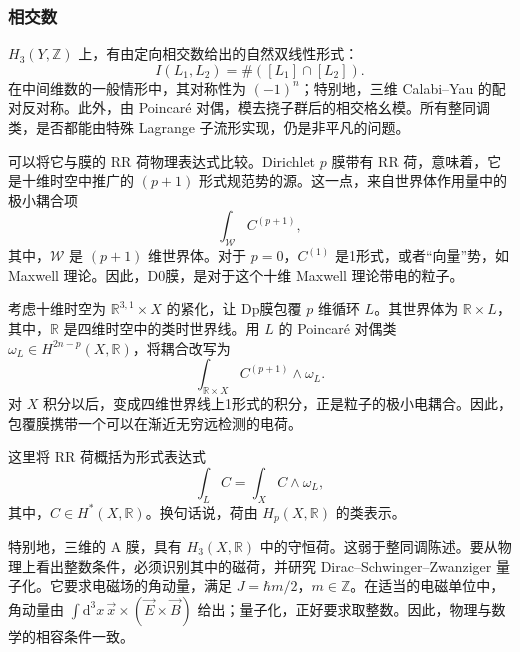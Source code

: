 \subsubsection{相交数}\label{sec:5.1.2.1}

$H_3(Y,\mathbb{Z})$ 上，有由定向相交数给出的自然双线性形式：
\begin{equation}\label{eq:5.2}
I(L_1,L_2)=\#([L_1]\cap[L_2]).
\end{equation}
在中间维数的一般情形中，其对称性为 $(-1)^n$；特别地，三维 Calabi--Yau 的配对反对称。此外，由 Poincar\'e 对偶，模去挠子群后的相交格幺模。所有整同调类，是否都能由特殊 Lagrange 子流形实现，仍是非平凡的问题。

可以将它与膜的 RR 荷物理表达式比较。Dirichlet $p$ 膜带有 RR 荷，意味着，它是十维时空中推广的 $(p+1)$ 形式规范势的源。这一点，来自世界体作用量中的极小耦合项
\begin{equation}\label{eq:5.3}
\int_{\mathcal W}C^{(p+1)},
\end{equation}
其中，$\mathcal W$ 是 $(p+1)$ 维世界体。对于 $p=0$，$C^{(1)}$ 是1形式，或者“向量”势，如 Maxwell 理论。因此，D0膜，是对于这个十维 Maxwell 理论带电的粒子。

考虑十维时空为 $\mathbb{R}^{3,1}\times X$ 的紧化，让 Dp膜包覆 $p$ 维循环 $L$。其世界体为 $\mathbb{R}\times L$，其中，$\mathbb{R}$ 是四维时空中的类时世界线。用 $L$ 的 Poincar\'e 对偶类 $\omega_L\in H^{2n-p}(X,\mathbb{R})$，将耦合改写为
\begin{equation}\label{eq:5.4}
\int_{\mathbb{R}\times X}C^{(p+1)}\wedge\omega_L.
\end{equation}
对 $X$ 积分以后，变成四维世界线上1形式的积分，正是粒子的极小电耦合。因此，包覆膜携带一个可以在渐近无穷远检测的电荷。

这里将 RR 荷概括为形式表达式
\begin{equation}\label{eq:5.5}
\int_LC=\int_XC\wedge\omega_L,
\end{equation}
其中，$C\in H^*(X,\mathbb{R})$。换句话说，荷由 $H_p(X,\mathbb{R})$ 的类表示。

特别地，三维的 A 膜，具有 $H_3(X,\mathbb{R})$ 中的守恒荷。这弱于整同调陈述。要从物理上看出整数条件，必须识别其中的磁荷，并研究 Dirac--Schwinger--Zwanziger 量子化。它要求电磁场的角动量，满足 $J=\hbar m/2$，$m\in\mathbb{Z}$。在适当的电磁单位中，角动量由 $\int\mathrm{d}^3x\,\vec x\times(\vec E\times\vec B)$ 给出；量子化，正好要求取整数。因此，物理与数学的相容条件一致。

